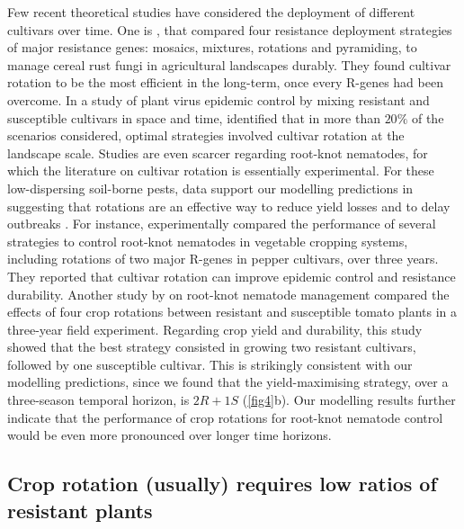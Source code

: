 {{{{Few recent theoretical studies have considered the deployment of
different cultivars over time. One is
\citet{Rimbaud2018}, that compared four resistance deployment
strategies of major resistance genes: mosaics, mixtures, rotations and
pyramiding, to manage cereal rust fungi in agricultural landscapes
durably. They found cultivar rotation to be the most efficient in the
long-term, once every R-genes had been overcome. In a study of plant
virus epidemic control by mixing resistant and susceptible cultivars
in space and time, \citet{Fabre2015} identified that in more than
$20\%$ of the scenarios considered, optimal strategies involved
cultivar rotation at the landscape scale. Studies are even scarcer
regarding {root-knot nematodes}, for which the literature on cultivar rotation is
essentially experimental. For these low-dispersing soil-borne pests,
data support our modelling predictions in suggesting that rotations
are an effective way to reduce yield losses and to delay outbreaks
\citep{Tzortzakakis2000,Miller2006,McSorley2011}.  For instance,
\citet{Djian-Caporalino2014} experimentally compared the performance
of several strategies to control {root-knot nematodes} in vegetable cropping systems,
including rotations of two major R-genes in pepper cultivars, over
three years. They reported that cultivar rotation can improve
epidemic control and resistance durability. Another study by
\citet{Talavera2009} on {root-knot nematode} management compared the effects of four
crop rotations between resistant and susceptible tomato plants in a
three-year field experiment. Regarding crop yield and durability, this
study showed that the best strategy consisted in growing two resistant
cultivars, followed by one susceptible cultivar. This is strikingly
consistent with our modelling predictions, since we found that the
yield-maximising strategy, over a three-season temporal horizon, is
$2R + 1S$ (\autoref{fig4}b). Our modelling results further indicate
that the performance of crop rotations for {root-knot nematode} control would be even
more pronounced over longer time horizons.

\subsection{Crop rotation (usually) requires low ratios of resistant plants}  \label{sec:discussion-lowratio}

}}}}
